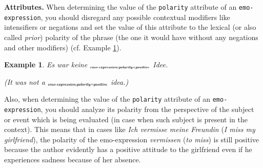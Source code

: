 \documentclass[11pt,a4paper]{article}
\theoremstyle{mytheoremstyle}
\newtheorem{exmp}{Example}[section]
\newcommand{\mtag}[2]{{\upshape[\emph{#2}\upshape]$_{\textrm{\bfseries\emph{\tiny
        #1}}}$}}
\newcommand{\emoexpression}[2][]{\mtag{emo-\-ex\-pression\ifstrempty{#1}{}{:#1}}{#2}}
\begin{document}
\noindent\textbf{Attributes.} When determining the value of the
\texttt{polarity} attribute of an \texttt{emo-expression}, you should
disregard any possible contextual modifiers like intensifiers or
negations and set the value of this attribute to the lexical (or also
called \emph{prior}) polarity of the phrase (the one it would have
without any negations and other modifiers) (cf. Example
\ref{exmp:emo-expression-polarity}).
\begin{exmp}
Es war keine \emoexpression[polarity=positive]{gute} Idee.

(It was not a \emoexpression[polarity=positive]{good} idea.)\label{exmp:emo-expression-polarity}
\end{exmp}

Also, when determining the value of the \texttt{polarity} attribute of
an \texttt{emo-expression}, you should analyze its polarity from the
perspective of the subject or event which is being evaluated (in case
when such subject is present in the context).  This means that in
cases like \textit{Ich vermisse meine Freundin} (\textit{I miss my
  girlfriend}), the polarity of the emo-expression \textit{vermissen}
(\textit{to miss}) is still positive because the author evidently has
a positive attitude to the girlfriend even if he experiences sadness
because of her absence.
\end{document}
